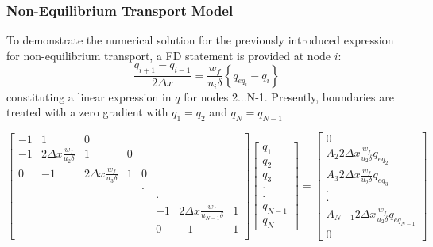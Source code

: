 \documentclass[aspectratio=169]{beamer}
\begin{document}
\begin{frame}
  \frametitle{Non-Equilibrium Transport Model} To demonstrate the
  numerical solution for the previously introduced expression for
  non-equilibrium transport, a FD statement is provided at node $i$:
  \begin{equation*}
    \frac{q_{i+1}-q_{i-1}}{2\Delta x} = \frac{w_f}{u_i \delta}\left\{ q_{eq_i} - q_i\right\} 
  \end{equation*}
constituting a linear expression in $q$ for nodes 2...N-1.  Presently,
boundaries are treated with a zero gradient with $q_1 = q_2$ and $q_N = q_{N-1}$ 

  \begin{equation*}
\begin{bmatrix}
-1 & 1                               & 0 & \\
-1 & 2\Delta x \frac{w_f}{u_2 \delta} & 1 & 0\\
0  & -1                              &2\Delta x \frac{w_f}{u_3 \delta}&1&0\\
&&&&\cdot\\
&&&&&\cdot\\
&&&&&-1&2\Delta x \frac{w_f}{u_{N-1} \delta}&1\\
&&&&&0 &-1&1\\
\end{bmatrix}
\begin{bmatrix}
  q_1\\
  q_2\\
  q_3\\
  \cdot\\
  \cdot\\
  q_{N-1}\\
    q_{N}
\end{bmatrix}
=
\begin{bmatrix}
  0\\
  A_2 2\Delta x \frac{w_f}{u_2 \delta}q_{eq_2}\\
  A_3 2\Delta x \frac{w_f}{u_2 \delta}q_{eq_3}\\
  \cdot\\
  \cdot\\
   A_{N-1} 2\Delta x \frac{w_f}{u_2 \delta}q_{eq_{N-1}}\\
  0
\end{bmatrix}
  \end{equation*}

\end{frame}
\end{document}
